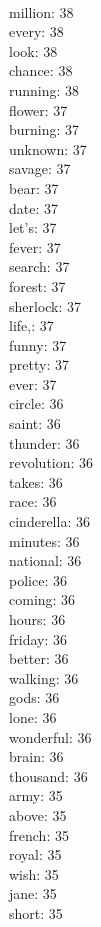 \begin{multicols}{6}
  \\ million: 38
  \\ every: 38
  \\ look: 38
  \\ chance: 38
  \\ running: 38
  \\ flower: 37
  \\ burning: 37
  \\ unknown: 37
  \\ savage: 37
  \\ bear: 37
  \\ date: 37
  \\ let's: 37
  \\ fever: 37
  \\ search: 37
  \\ forest: 37
  \\ sherlock: 37
  \\ life,: 37
  \\ funny: 37
  \\ pretty: 37
  \\ ever: 37
  \\ circle: 36
  \\ saint: 36
  \\ thunder: 36
  \\ revolution: 36
  \\ takes: 36
  \\ race: 36
  \\ cinderella: 36
  \\ minutes: 36
  \\ national: 36
  \\ police: 36
  \\ coming: 36
  \\ hours: 36
  \\ friday: 36
  \\ better: 36
  \\ walking: 36
  \\ gods: 36
  \\ lone: 36
  \\ wonderful: 36
  \\ brain: 36
  \\ thousand: 36
  \\ army: 35
  \\ above: 35
  \\ french: 35
  \\ royal: 35
  \\ wish: 35
  \\ jane: 35
  \\ short: 35

\end{multicols}
